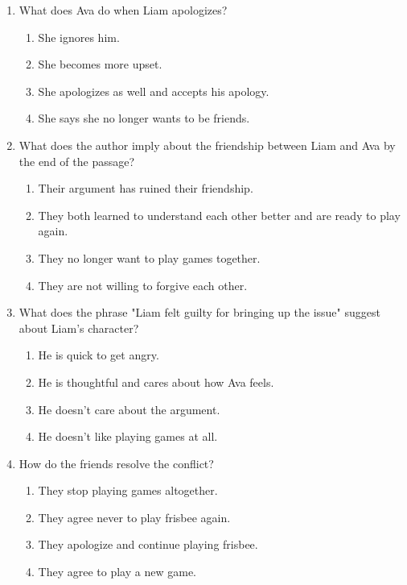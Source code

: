 \documentclass[12pt]{article}
\begin{document}
\begin{enumerate}
    \item What does Ava do when Liam apologizes?
    \begin{enumerate}[label=\Alph*.]
        \item She ignores him.
        \item She becomes more upset.
        \item She apologizes as well and accepts his apology.
        \item She says she no longer wants to be friends.
    \end{enumerate}
    \vspace{0.5cm}

    \item What does the author imply about the friendship between Liam and Ava by the end of the passage?
    \begin{enumerate}[label=\Alph*.]
        \item Their argument has ruined their friendship.
        \item They both learned to understand each other better and are ready to play again.
        \item They no longer want to play games together.
        \item They are not willing to forgive each other.
    \end{enumerate}
    \vspace{0.5cm}

    \item What does the phrase "Liam felt guilty for bringing up the issue" suggest about Liam’s character?
    \begin{enumerate}[label=\Alph*.]
        \item He is quick to get angry.
        \item He is thoughtful and cares about how Ava feels.
        \item He doesn’t care about the argument.
        \item He doesn’t like playing games at all.
    \end{enumerate}
    \vspace{0.5cm}

    \item How do the friends resolve the conflict?
    \begin{enumerate}[label=\Alph*.]
        \item They stop playing games altogether.
        \item They agree never to play frisbee again.
        \item They apologize and continue playing frisbee.
        \item They agree to play a new game.
    \end{enumerate}
    \vspace{0.5cm}


\end{enumerate}
\end{document}
